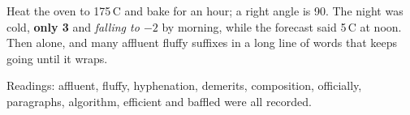 \documentclass[11pt]{article}
\begin{document}
Heat the oven to 175\,\textdegree C and bake for an hour; a right angle is 90\textdegree.
The night was cold, \textbf{only 3\textdegree} and \textit{falling to $-2$\textdegree} by morning,
while {\small the forecast said 5\,\textdegree C} at noon. Then \textdegree{} alone, and many \textdegree affluent fluffy suffixes in a long line of words that keeps going until it wraps.

\begin{minipage}{4cm}
Readings: \textdegree affluent, \textdegree fluffy, \textdegree hyphenation, \textdegree demerits,
\textdegree composition, \textdegree officially, \textdegree paragraphs, \textdegree algorithm,
\textdegree efficient and \textdegree baffled were all recorded.
\end{minipage}
\end{document}
